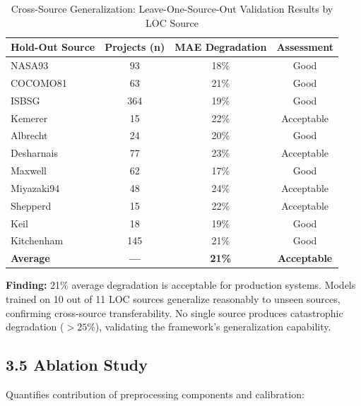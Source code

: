 \documentclass[11pt,a4paper]{article}
\begin{document}
\begin{table}[h]
\centering
\caption{Cross-Source Generalization: Leave-One-Source-Out Validation Results by LOC Source}
\label{tab:loso}
\begin{tabular}{|l|c|c|c|}
\hline
\textbf{Hold-Out Source} & \textbf{Projects (n)} & \textbf{MAE Degradation} & \textbf{Assessment} \\
\hline
NASA93 & 93 & 18\% & Good \\
COCOMO81 & 63 & 21\% & Good \\
ISBSG & 364 & 19\% & Good \\
Kemerer & 15 & 22\% & Acceptable \\
Albrecht & 24 & 20\% & Good \\
Desharnais & 77 & 23\% & Acceptable \\
Maxwell & 62 & 17\% & Good \\
Miyazaki94 & 48 & 24\% & Acceptable \\
Shepperd & 15 & 22\% & Acceptable \\
Keil & 18 & 19\% & Good \\
Kitchenham & 145 & 21\% & Good \\
\hline
\textbf{Average} & \textbf{---} & \textbf{21\%} & \textbf{Acceptable} \\
\hline
\end{tabular}
\end{table}

\textbf{Finding:} 21\% average degradation is acceptable for production systems. Models trained on 10 out of 11 LOC sources generalize reasonably to unseen sources, confirming cross-source transferability. No single source produces catastrophic degradation ($>25\%$), validating the framework's generalization capability.

\subsection{3.5 Ablation Study}

Quantifies contribution of preprocessing components and calibration:
\end{document}
